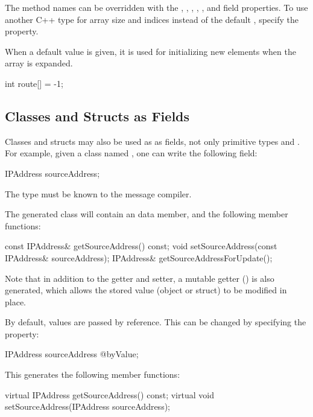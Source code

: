 The method names can be overridden with the , ,
, , , 
and  field properties. To use another C++ type for array size and
indices instead of the default , specify the 
property.

When a default value is given, it is used for initializing new elements
when the array is expanded.

\begin{msg}
int route[] = -1;
\end{msg}


\subsection{Classes and Structs as Fields}
\label{sec:msg-defs:other-types-as-fields}

Classes and structs may also be used as as fields, not only primitive types and
. For example, given a class named , one can write
the following field:

\begin{msg}
IPAddress sourceAddress;
\end{msg}

The  type must be known to the message compiler.

The generated class will contain an  data member, and the
following member functions:

\begin{cpp}
const IPAddress& getSourceAddress() const;
void setSourceAddress(const IPAddress& sourceAddress);
IPAddress& getSourceAddressForUpdate();
\end{cpp}

Note that in addition to the getter and setter, a mutable getter
() is also generated, which allows the stored value (object
or struct) to be modified in place.

By default, values are passed by reference. This can be changed by specifying
the  property:

\begin{msg}
IPAddress sourceAddress @byValue;
\end{msg}

This generates the following member functions:

\begin{cpp}
virtual IPAddress getSourceAddress() const;
virtual void setSourceAddress(IPAddress sourceAddress);
\end{cpp}

